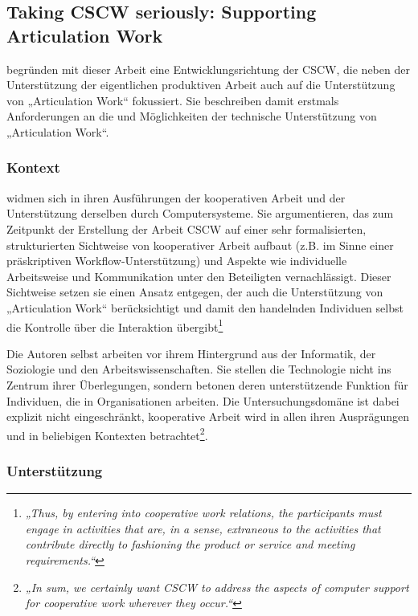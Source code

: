 
\subsection{Taking CSCW seriously: Supporting Articulation Work}

\citet{Schmidt92} begründen mit dieser Arbeit eine Entwicklungsrichtung der \gls{CSCW}, die neben der Unterstützung der eigentlichen produktiven Arbeit auch auf die Unterstützung von „Articulation Work“ fokussiert. Sie beschreiben damit erstmals Anforderungen an die und Möglichkeiten der technische Unterstützung von „Articulation Work“.

\subsubsection{Kontext}

\citet{Schmidt92} widmen sich in ihren Ausführungen der kooperativen Arbeit und der Unterstützung derselben durch Computersysteme. Sie argumentieren, das zum Zeitpunkt der Erstellung der Arbeit \gls{CSCW} auf einer sehr formalisierten, strukturierten Sichtweise von kooperativer Arbeit aufbaut (z.B. im Sinne einer präskriptiven Workflow-Unterstützung) und Aspekte wie individuelle Arbeitsweise und Kommunikation unter den Beteiligten vernachlässigt. Dieser Sichtweise setzen sie einen Ansatz entgegen, der auch die Unterstützung von „Articulation Work“ berücksichtigt und damit den handelnden Individuen selbst die Kontrolle über die Interaktion übergibt\footnote{\emph{„Thus, by entering into cooperative work relations, the participants must engage in activities that are, in a sense, extraneous to the activities that contribute directly to fashioning the product or service and meeting requirements.“}\citep[][S. 8]{Schmidt92}}

Die Autoren selbst arbeiten vor ihrem Hintergrund aus der Informatik, der Soziologie und den Arbeitswissenschaften. Sie stellen die Technologie nicht ins Zentrum ihrer Überlegungen, sondern betonen deren unterstützende Funktion für  Individuen, die in Organisationen arbeiten. Die Untersuchungsdomäne ist dabei explizit nicht eingeschränkt, kooperative Arbeit wird in allen ihren Ausprägungen und in beliebigen Kontexten betrachtet\footnote{\emph{„In sum, we certainly want CSCW to address the aspects of computer support for cooperative work wherever they occur.“}\citep[][S. 11]{Schmidt92}}.

\subsubsection{Unterstützung}

